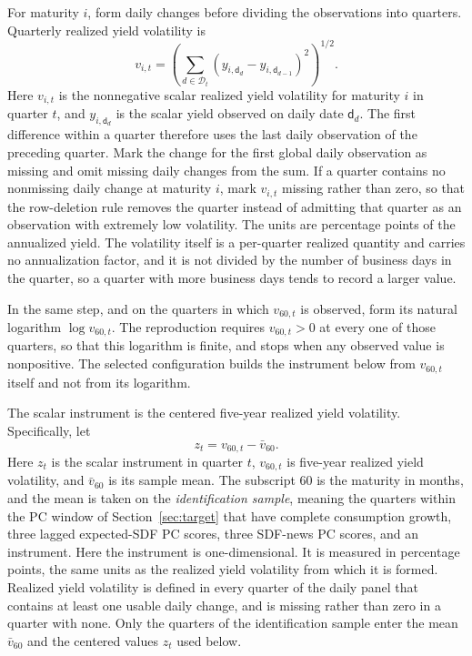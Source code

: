 \documentclass[11pt]{article}
\begin{document}
For maturity \(i\), form daily changes before dividing the observations into quarters. Quarterly
realized yield volatility is
\begin{equation*}
 v_{i,t}=\left(\sum_{d\in\mathcal D_t}
       (y_{i,\mathsf d_d}-y_{i,\mathsf d_{d-1}})^2\right)^{1/2}.
\end{equation*}
Here \(v_{i,t}\) is the nonnegative scalar realized yield volatility for maturity \(i\) in quarter
\(t\), and \(y_{i,\mathsf d_d}\) is the scalar yield observed on daily date \(\mathsf d_d\). The
first difference within a quarter therefore uses the last daily observation of the preceding
quarter. Mark the change for the first global daily observation as missing and omit missing daily
changes from the sum. If a quarter contains no nonmissing daily change at maturity \(i\), mark
\(v_{i,t}\) missing rather than zero, so that the row-deletion rule removes the quarter instead of
admitting that quarter as an observation with extremely low volatility. The units are percentage points of the annualized yield.
The volatility itself is a per-quarter realized quantity and carries no annualization factor, and it
is not divided by the number of business days in the quarter, so a quarter with more business days
tends to record a larger value.

In the same step, and on the quarters in which \(v_{60,t}\) is observed, form its natural logarithm
\(\log v_{60,t}\). The reproduction requires \(v_{60,t}>0\) at every one of those quarters, so that
this logarithm is finite, and stops when any observed value is nonpositive. The selected
configuration builds the instrument below from \(v_{60,t}\) itself and not from its logarithm.

The scalar instrument is the centered five-year realized yield volatility. Specifically,
let
\begin{equation*}
 z_t=v_{60,t}-\bar v_{60}.
\end{equation*}
Here \(z_t\) is the scalar instrument in quarter \(t\), \(v_{60,t}\) is five-year realized yield
volatility, and \(\bar v_{60}\) is its sample mean. The subscript 60 is the maturity in months, and
the mean is taken on the \emph{identification sample}, meaning
the quarters within the PC window of Section~\ref{sec:target} that have complete
consumption growth, three lagged expected-SDF PC scores, three
SDF-news PC scores, and an instrument. Here the instrument is one-dimensional. It is measured in
percentage points, the same units as the realized yield volatility from which it is formed. Realized
yield volatility is defined in every quarter of the daily panel that contains at least one usable
daily change, and is missing rather than zero in a quarter with none. Only the quarters of the
identification sample enter the mean \(\bar v_{60}\) and the centered values \(z_t\) used below.
\end{document}
